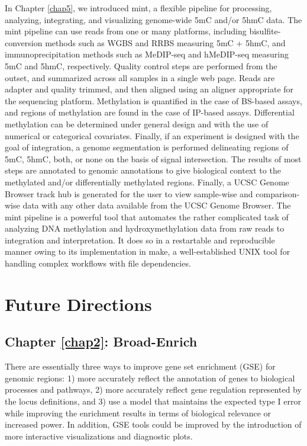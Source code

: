 In Chapter \ref{chap5}, we introduced mint, a flexible pipeline for processing, analyzing, integrating, and visualizing genome-wide 5mC and/or 5hmC data. The mint pipeline can use reads from one or many platforms, including bisulfite-conversion methods such as WGBS and RRBS measuring 5mC + 5hmC, and immunoprecipitation methods such as MeDIP-seq and hMeDIP-seq measuring 5mC and 5hmC, respectively. Quality control steps are performed from the outset, and summarized across all samples in a single web page. Reads are adapter and quality trimmed, and then aligned using an aligner appropriate for the sequencing platform. Methylation is quantified in the case of BS-based assays, and regions of methylation are found in the case of IP-based assays. Differential methylation can be determined under general design and with the use of numerical or categorical covariates. Finally, if an experiment is designed with the goal of integration, a genome segmentation is performed delineating regions of 5mC, 5hmC, both, or none on the basis of signal intersection. The results of most steps are annotated to genomic annotations to give biological context to the methylated and/or differentially methylated regions. Finally, a UCSC Genome Browser track hub is generated for the user to view sample-wise and comparison-wise data with any other data available from the UCSC Genome Browser. The mint pipeline is a powerful tool that automates the rather complicated task of analyzing DNA methylation and hydroxymethylation data from raw reads to integration and interpretation. It does so in a restartable and reproducible manner owing to its implementation in make, a well-established UNIX tool for handling complex workflows with file dependencies.

\section{Future Directions}
\label{future}

\subsection{Chapter \ref{chap2}: Broad-Enrich}
\label{broadenrich_conclusion}

There are essentially three ways to improve gene set enrichment (GSE) for genomic regions: 1) more accurately reflect the annotation of genes to biological processes and pathways, 2) more accurately reflect gene regulation represented by the locus definitions, and 3) use a model that maintains the expected type I error while improving the enrichment results in terms of biological relevance or increased power. In addition, GSE tools could be improved by the introduction of more interactive visualizations and diagnostic plots.

